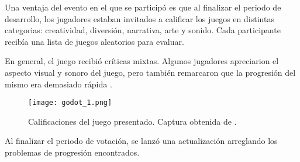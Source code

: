 \par Una ventaja del evento en el que se participó es que al finalizar el periodo de desarrollo, los jugadores estaban invitados a calificar los juegos en distintas categorias: creatividad, diversión, narrativa, arte y sonido. Cada participante recibía una lista de juegos aleatorios para evaluar.
\par En general, el juego recibió críticas mixtas. Algunos jugadores apreciarion el aspecto visual y sonoro del juego, pero también remarcaron que la progresión del mismo era demasiado rápida \cite{GrindGrindFollowtherules}.
\begin{figure}[H]
  \centering
  \texttt{[image: godot\_1.png]}
  \caption{Calificaciones del juego presentado. Captura obtenida de \cite{GrindGrindFollowtherules}.}
  \label{fig:x calificaciones prototipo 1} 
\end{figure}
\par Al finalizar el periodo de votación, se lanzó una actualización arreglando los problemas de progresión encontrados.  %